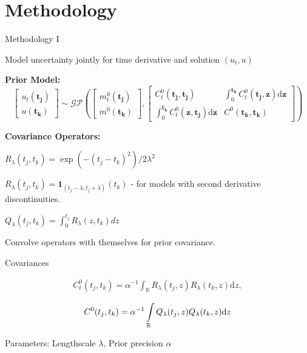 \documentclass[usenames,dvipsnames]{beamer}
\theoremstyle{definition}
\begin{document}



\section{Methodology}
\begin{frame}{Methodology I}

Model uncertainty jointly for time derivative and solution $(u_t, u)$

\textbf{Prior Model: }
$$\left.\begin{bmatrix}u_t(\mathbf{t_j})\\u(\mathbf{t_k})\end{bmatrix}\sim\mathcal{GP}\left(\begin{bmatrix}m_t^0(\mathbf{t_j})\\m^0(\mathbf{t_k})\end{bmatrix}\right.,\begin{bmatrix}C_t^0(\mathbf{t_j},\mathbf{t_j})&\int_0^{\mathbf{t_k}}C_t^0(\mathbf{t_j},\mathbf{z})\mathrm{d}\mathbf{z}\\\int_0^{\mathbf{t_k}}C_t^0(\mathbf{z},\mathbf{t_j})\mathrm{d}\mathbf{z}&C^0(\mathbf{t_k},\mathbf{t_k})\end{bmatrix}\right)$$

\textbf{Covariance Operators:}

$R_\lambda (t_j, t_k) = \exp (-(t_j - t_k)^2)/2\lambda^2$

$R_\lambda (t_j, t_k) = \mathbf{1}_{(t_j - \lambda, t_j + \lambda)}(t_k)$ - for models with second derivative discontinuities.

$Q_\lambda (t_j, t_k) = \int_{0}^{t_j}R_\lambda (z, t_k) dz$

Convolve operators with themselves for prior covariance.

\end{frame}

\begin{frame}{Covariances}

$$\begin{aligned}C_t^0(t_j,t_k)=\alpha^{-1}\int_{\mathbb{R}}R_\lambda(t_j,z)R_\lambda(t_k,z)\mathrm{d}z,\end{aligned}$$

$$C^0(t_j,t_k)=\alpha^{-1}\intop_{\mathbb{R}}Q_\lambda(t_j,z)Q_\lambda(t_k,z)\mathrm{d}z$$

Parameters: Lengthscale $\lambda$, Prior precision $\alpha$

\end{frame}
\end{document}
